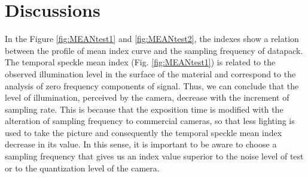 \documentclass[review]{elsarticle}
\begin{document}
\section{Discussions} 
\label{sec:analysisresults}


In the Figure \ref{fig:MEANtest1} and \ref{fig:MEANtest2}, 
the indexes show a relation between the profile of mean index curve and the sampling frequency of datapack. 
The temporal speckle mean index (Fig. \ref{fig:MEANtest1}) is related to 
the observed illumination level in the surface of the material \cite{Nothdurft:05} and  
correspond to the analysis of zero frequency components of signal.
Thus, we can conclude that the level of illumination, perceived by the camera, 
decrease with the increment of sampling rate. 
This is because that the exposition time is modified with the alteration of sampling frequency to commercial cameras, 
so that less lighting is used to take the picture and consequently the 
temporal speckle mean index decrease in  its value.
In this sense, it is important to be aware to choose a sampling frequency
that gives us an index value superior to the noise level of test or to the quantization level of the camera.
\end{document}

